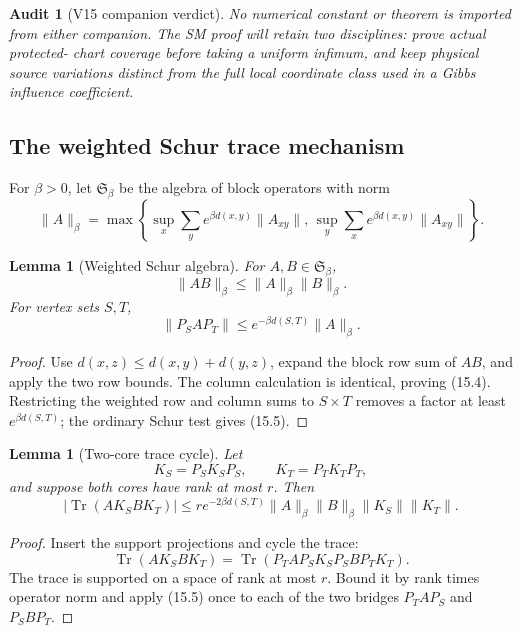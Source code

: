 \documentclass[11pt]{article}
\newtheorem{lemma}[theorem]{Lemma}
\newtheorem{audit}[theorem]{Audit}
\theoremstyle{remark}
\begin{document}
\begin{audit}[V15 companion verdict]
\label{aud:v15v15-verdict}
No numerical constant or theorem is imported from either companion.
The SM proof will retain two disciplines: prove actual protected-
chart coverage before taking a uniform infimum, and keep physical
source variations distinct from the full local coordinate class
used in a Gibbs influence coefficient.
\end{audit}

\subsection{The weighted Schur trace mechanism}

For \(\beta>0\), let \(\mathfrak S_\beta\) be the algebra of block
operators with norm
\[
 \|A\|_\beta
 =
 \max\left\{
 \sup_x\sum_y e^{\beta d(x,y)}\|A_{xy}\|,\,
 \sup_y\sum_x e^{\beta d(x,y)}\|A_{xy}\|
 \right\}.                                                   \tag{15.3}
\]

\begin{lemma}[Weighted Schur algebra]
\label{lem:v15v15-algebra}
For \(A,B\in\mathfrak S_\beta\),
\[
 \|AB\|_\beta\le\|A\|_\beta\|B\|_\beta.                      \tag{15.4}
\]
For vertex sets \(S,T\),
\[
 \|P_SAP_T\|
 \le e^{-\beta d(S,T)}\|A\|_\beta.                           \tag{15.5}
\]
\end{lemma}

\begin{proof}
Use \(d(x,z)\le d(x,y)+d(y,z)\), expand the block row sum
of \(AB\), and apply the two row bounds.  The column calculation is
identical, proving (15.4).  Restricting the weighted row and column
sums to \(S\times T\) removes a factor at least
\(e^{\beta d(S,T)}\); the ordinary Schur test gives (15.5).
\end{proof}

\begin{lemma}[Two-core trace cycle]
\label{lem:v15v15-cycle}
Let
\[
 K_S=P_SK_SP_S,\qquad K_T=P_TK_TP_T,
\]
and suppose both cores have rank at most \(r\).  Then
\[
 \boxed{
 |\operatorname{Tr}(A K_S B K_T)|
 \le
 r e^{-2\beta d(S,T)}
 \|A\|_\beta\|B\|_\beta\|K_S\|\|K_T\|.}                    \tag{15.6}
\]
\end{lemma}

\begin{proof}
Insert the support projections and cycle the trace:
\[
 \operatorname{Tr}(A K_S B K_T)
 =
 \operatorname{Tr}\left(
 P_TAP_SK_SP_SBP_TK_T
 \right).
\]
The trace is supported on a space of rank at most \(r\).  Bound it
by rank times operator norm and apply (15.5) once to each of the
two bridges \(P_TAP_S\) and \(P_SBP_T\).
\end{proof}
\end{document}
